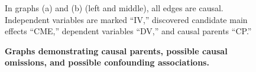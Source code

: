 {\begin{figure}


        \caption{\textbf{Graphs demonstrating causal parents, possible causal omissions, and possible confounding associations.}}
            \begin{small}
            \begin{minipage}{\linewidth}
                In graphs (a) and (b) (left and middle), all edges are causal. Independent variables are marked ``IV,'' discovered candidate main effects ``CME,'' dependent variables ``DV,'' and causal parents ``CP.''
            \end{minipage}
            \end{small}
        \label{fig:figureCandidateMainEffects}
    \end{figure}
}

